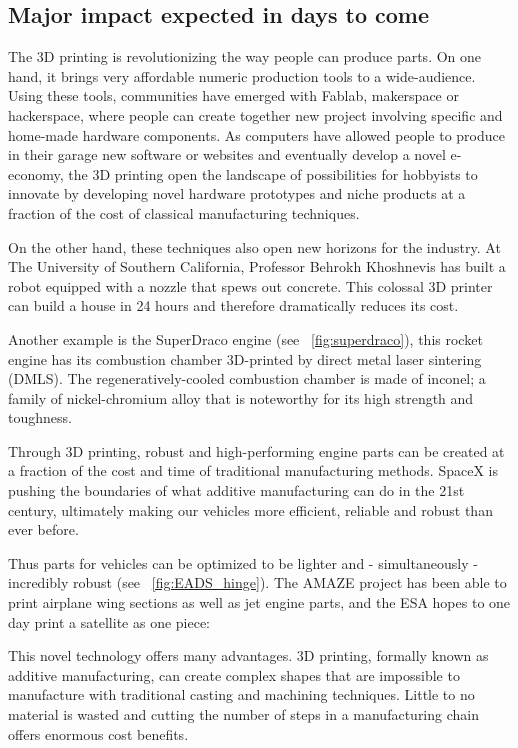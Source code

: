 \subsection{Major impact expected in days to come} %

The 3D printing is revolutionizing the way people can produce parts. On one hand, it brings very affordable numeric production tools to a wide-audience. Using these tools, communities have emerged with Fablab, makerspace or hackerspace, where people can create together new project involving specific and home-made hardware components. As computers have allowed people to produce in their garage new software or websites and eventually develop a novel e-economy, the 3D printing open the landscape of possibilities for hobbyists to innovate by developing novel hardware prototypes and niche products at a fraction of the cost of classical manufacturing techniques.

On the other hand, these techniques also open new horizons for the industry. At The University of Southern California, Professor Behrokh Khoshnevis has built a robot equipped with a nozzle that spews out concrete. This  colossal 3D printer can build a house in 24 hours and therefore dramatically reduces its cost.

Another example is the SuperDraco engine (see \figurename~\ref{fig:superdraco}), this rocket engine has its combustion chamber 3D-printed by direct metal laser sintering (DMLS). The regeneratively-cooled combustion chamber is made of inconel; a family of nickel-chromium alloy that is noteworthy for its high strength and toughness.

\begin{formal}
    Through 3D printing, robust and high-performing engine parts can be created at a fraction of the cost and time of traditional manufacturing methods. SpaceX is pushing the boundaries of what additive manufacturing can do in the 21st century, ultimately making our vehicles more efficient, reliable and robust than ever before.

\end{formal}

Thus parts for vehicles can be optimized to be lighter and - simultaneously - incredibly robust (see \figurename~\ref{fig:EADS_hinge}). The AMAZE project has been able to print airplane wing sections as well as jet engine parts, and the ESA hopes to one day print a satellite as one piece:
\begin{formal}
    This novel technology offers many advantages. 3D printing, formally known as additive manufacturing, can create complex shapes that are impossible to manufacture with traditional casting and machining techniques. Little to no material is wasted and cutting the number of steps in a manufacturing chain offers enormous cost benefits.

\end{formal}

